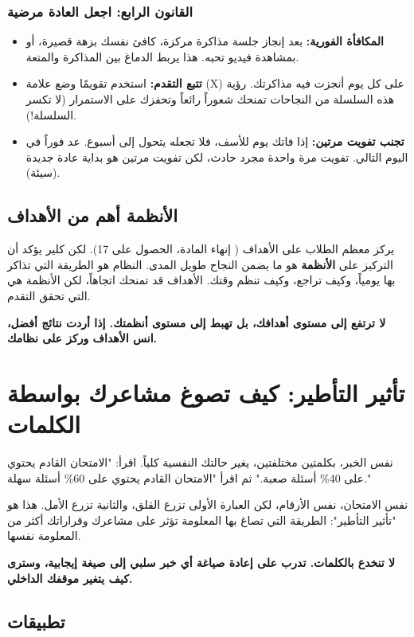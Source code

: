 \documentclass[12pt,a4paper]{book}
\newcommand{\importantAr}[1]{%
	\begin{important}
		\bfseries #1
	\end{important}
}
\begin{document}
	\subsubsection{القانون الرابع: اجعل العادة مرضية }
	\begin{itemize}
		\item \textbf{المكافأة الفورية:} بعد إنجاز جلسة مذاكرة مركزة، كافئ نفسك بزهة قصيرة، أو بمشاهدة فيديو تحبه. هذا يربط الدماغ بين المذاكرة والمتعة.
		\item \textbf{تتبع التقدم:} استخدم تقويمًا وضع علامة (X) على كل يوم أنجزت فيه مذاكرتك. رؤية هذه السلسلة من النجاحات تمنحك شعوراً رائعاً وتحفزك على الاستمرار (لا تكسر السلسلة!).
		\item \textbf{تجنب تفويت مرتين:} إذا فاتك يوم للأسف، فلا تجعله يتحول إلى أسبوع. عد فوراً في اليوم التالي. تفويت مرة واحدة مجرد حادث، لكن تفويت مرتين هو بداية عادة جديدة (سيئة).
	\end{itemize}
	
	\subsection{الأنظمة أهم من الأهداف}
\label{sec:systems-over-goals}
	يركز معظم الطلاب على الأهداف ( إنهاء المادة، الحصول على 17). لكن كلير يؤكد أن التركيز على \textbf{الأنظمة} هو ما يضمن النجاح طويل المدى. النظام هو الطريقة التي تذاكر بها يومياً، وكيف تراجع، وكيف تنظم وقتك. الأهداف قد تمنحك اتجاهاً، لكن الأنظمة هي التي تحقق التقدم.
	
	\importantAr{
		لا ترتفع إلى مستوى أهدافك، بل تهبط إلى مستوى أنظمتك. إذا أردت نتائج أفضل، انس الأهداف وركز على نظامك.
	}
	
	\section{تأثير التأطير: كيف تصوغ مشاعرك بواسطة الكلمات}
	\label{sec:framing-effect}
	
	نفس الخبر، بكلمتين مختلفتين، يغير حالتك النفسية كلياً. اقرأ: "الامتحان القادم يحتوي على 40\% أسئلة صعبة." ثم اقرأ "الامتحان القادم يحتوي على 60\% أسئلة سهلة."
	
	نفس الامتحان، نفس الأرقام، لكن العبارة الأولى تزرع القلق، والثانية تزرع الأمل. هذا هو "تأثير التأطير": الطريقة التي تصاغ بها المعلومة تؤثر على مشاعرك وقراراتك أكثر من المعلومة نفسها.
	
	\importantAr{لا تنخدع بالكلمات. تدرب على إعادة صياغة أي خبر سلبي إلى صيغة إيجابية، وسترى كيف يتغير موقفك الداخلي.}
	
	\subsection*{تطبيقات}
	
\end{document}
